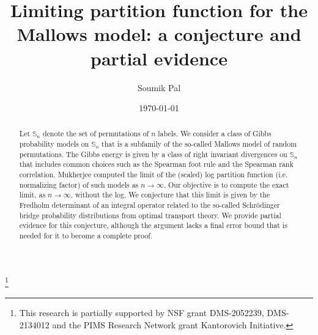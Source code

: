 \documentclass{amsart}
\newcommand{\perm}{\mathbb{S}}
\begin{document}
\theoremstyle{plain}
\newtheorem{thm}{Theorem}
\newtheorem{lemma}[thm]{Lemma}
\newtheorem{prop}[thm]{Proposition}
\newtheorem{cor}[thm]{Corollary}


\theoremstyle{definition}
\newtheorem{defn}{Definition}
\newtheorem{asmp}{Assumption}
\newtheorem{notn}{Notation}
\newtheorem{prb}{Problem}


\theoremstyle{remark}
\newtheorem{rmk}{Remark}
\newtheorem{exm}{Example}
\newtheorem{clm}{Claim}

\title[Partition function for the Mallows model]{Limiting partition function for the Mallows model: a conjecture and partial evidence}
\author{Soumik Pal}
\address{Department of Mathematics\\ University of Washington\\ Seattle, WA 98195}




\thanks{This research is partially supported by NSF grant DMS-2052239, DMS-2134012 and the PIMS Research Network grant Kantorovich Initiative.}


\date{\today}

\begin{abstract} Let $\perm_n$ denote the set of  permutations of $n$ labels. We consider a class of Gibbs probability models on $\perm_n$ that is a subfamily of the so-called Mallows model of random permutations. The Gibbs energy is given by a class of right invariant divergences on $\perm_n$ that includes common choices such as the Spearman foot rule and the Spearman rank correlation. Mukherjee \cite{Mukherjee16} computed the limit of the (scaled) log partition function (i.e. normalizing factor) of such models as $n\rightarrow \infty$. Our objective is to compute the exact limit, as $n\rightarrow \infty$, without the log. We conjecture that this limit is given by the Fredholm determinant of an integral operator related to the so-called Schr\"odinger bridge probability distributions from optimal transport theory. We provide partial evidence for this conjecture, although the argument lacks a final error bound that is needed for it to become a complete proof. 
 \end{abstract}

\maketitle
\end{document}
